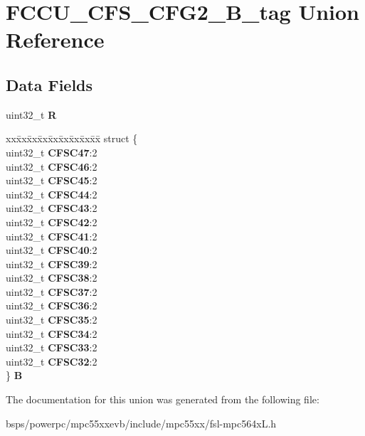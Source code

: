 \hypertarget{unionFCCU__CFS__CFG2__32B__tag}{}\section{F\+C\+C\+U\+\_\+\+C\+F\+S\+\_\+\+C\+F\+G2\+\_\+B\+\_\+tag Union Reference}
\label{unionFCCU__CFS__CFG2__32B__tag}
\subsection*{Data Fields}
\begin{DoxyCompactItemize}
\item 
\mbox{\label{unionFCCU__CFS__CFG2__32B__tag_aeb6c391d84287256d49255751a25c4ba}} 
uint32\+\_\+t {\bfseries R}
\item 
\mbox{\label{unionFCCU__CFS__CFG2__32B__tag_a9df6ddfdb2086e7d230e2dd02b86c3c6}} 
\begin{tabbing}
xx\=xx\=xx\=xx\=xx\=xx\=xx\=xx\=xx\=\kill
struct \{\\
\>uint32\_t {\bfseries CFSC47}:2\\
\>uint32\_t {\bfseries CFSC46}:2\\
\>uint32\_t {\bfseries CFSC45}:2\\
\>uint32\_t {\bfseries CFSC44}:2\\
\>uint32\_t {\bfseries CFSC43}:2\\
\>uint32\_t {\bfseries CFSC42}:2\\
\>uint32\_t {\bfseries CFSC41}:2\\
\>uint32\_t {\bfseries CFSC40}:2\\
\>uint32\_t {\bfseries CFSC39}:2\\
\>uint32\_t {\bfseries CFSC38}:2\\
\>uint32\_t {\bfseries CFSC37}:2\\
\>uint32\_t {\bfseries CFSC36}:2\\
\>uint32\_t {\bfseries CFSC35}:2\\
\>uint32\_t {\bfseries CFSC34}:2\\
\>uint32\_t {\bfseries CFSC33}:2\\
\>uint32\_t {\bfseries CFSC32}:2\\
\} {\bfseries B}\\

\end{tabbing}\end{DoxyCompactItemize}


The documentation for this union was generated from the following file\+:\begin{DoxyCompactItemize}
\item 
bsps/powerpc/mpc55xxevb/include/mpc55xx/fsl-\/mpc564x\+L.\+h\end{DoxyCompactItemize}
